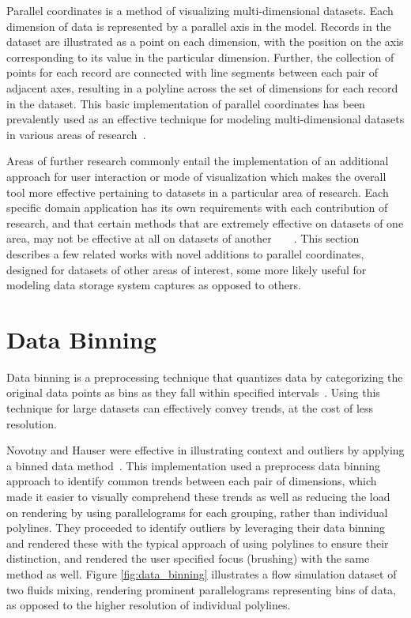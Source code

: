 \documentclass[12pt]{ucthesis}
\begin{document}
Parallel coordinates is a method of visualizing multi-dimensional datasets. Each dimension of data is represented by a parallel axis in the model. Records in the dataset are illustrated as a point on each dimension, with the position on the axis corresponding to its value in the particular dimension. Further, the collection of points for each record are connected with line segments between each pair of adjacent axes, resulting in a polyline across the set of dimensions for each record in the dataset. This basic implementation of parallel coordinates has been prevalently used as an effective technique for modeling multi-dimensional datasets in various areas of research~\cite{Inselberg:1990:PCT:949531.949588}.

Areas of further research commonly entail the implementation of an additional approach for user interaction or mode of visualization which makes the overall tool more effective pertaining to datasets in a particular area of research. Each specific domain application has its own requirements with each contribution of research, and that certain methods that are extremely effective on datasets of one area, may not be effective at all on datasets of another~\cite{novotny:2006:OPFC}~\cite{johansson:2007:DCDTPC}~\cite{peng:2005:CRMD}~\cite{Graham:2003:UCE}. This section describes a few related works with novel additions to parallel coordinates, designed for datasets of other areas of interest, some more likely useful for modeling data storage system captures as opposed to others.

\section{Data Binning}
\label{data_binning}
Data binning is a preprocessing technique that quantizes data by categorizing the original data points as bins as they fall within specified intervals~\cite{website:binning}. Using this technique for large datasets can effectively convey trends, at the cost of less resolution.

Novotny and Hauser were effective in illustrating context and outliers by applying a binned data method~\cite{novotny:2006:OPFC}. This implementation used a preprocess data binning approach to identify common trends between each pair of dimensions, which made it easier to visually comprehend these trends as well as reducing the load on rendering by using parallelograms for each grouping, rather than individual polylines. They proceeded to identify outliers by leveraging their data binning and rendered these with the typical approach of using polylines to ensure their distinction, and rendered the user specified focus (brushing) with the same method as well. Figure \ref{fig:data_binning} illustrates a flow simulation dataset of two fluids mixing, rendering prominent parallelograms representing bins of data, as opposed to the higher resolution of individual polylines.
\end{document}
